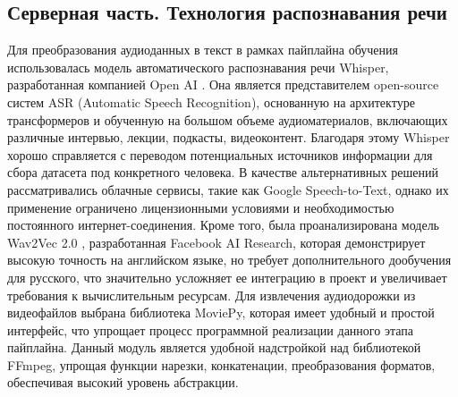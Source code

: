 \begin{table}[h!]
\centering
\caption{Сравнение моделей по бенчмарку PingPong}
\label{tab:pingpong}
\end{table}

\subsection{Серверная часть. Технология распознавания речи}
Для преобразования аудиоданных в текст в рамках пайплайна обучения использовалась модель автоматического распознавания речи Whisper, разработанная компанией Open AI \cite{Zhao2024WhisperPMFA}. Она является представителем open-source систем ASR (Automatic Speech Recognition), основанную на архитектуре трансформеров и обученную на большом объеме аудиоматериалов, включающих различные интервью, лекции, подкасты, видеоконтент. Благодаря этому Whisper хорошо справляется с переводом потенциальных источников информации для сбора датасета под конкретного человека.
В качестве альтернативных решений рассматривались облачные сервисы, такие как Google Speech-to-Text, однако их применение ограничено лицензионными условиями и необходимостью постоянного интернет-соединения. Кроме того, была проанализирована модель Wav2Vec 2.0 \cite{Baevski2020Wav2Vec2}, разработанная Facebook AI Research, которая демонстрирует высокую точность на английском языке, но требует дополнительного дообучения для русского, что значительно усложняет ее интеграцию в проект и увеличивает требования к вычислительным ресурсам.
Для извлечения аудиодорожки из видеофайлов выбрана библиотека MoviePy, которая имеет удобный и простой интерфейс, что упрощает процесс программной реализации данного этапа пайплайна. Данный модуль является удобной надстройкой над библиотекой FFmpeg, упрощая функции нарезки, конкатенации, преобразования форматов, обеспечивая высокий уровень абстракции. 



